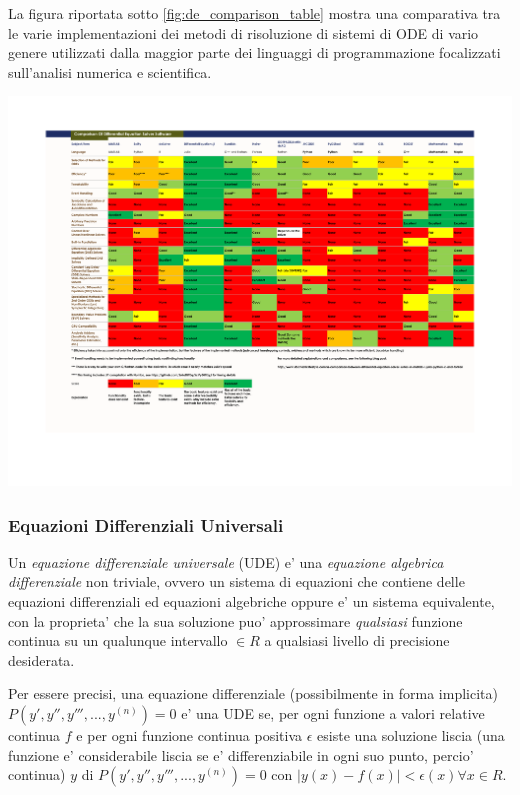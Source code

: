 La figura riportata sotto \ref{fig:de_comparison_table} \cite{10.15200/winn.153459.98975} mostra una comparativa tra le varie implementazioni dei 
metodi di risoluzione di sistemi di ODE di vario genere utilizzati dalla maggior
parte dei linguaggi di programmazione focalizzati sull'analisi numerica e scientifica.

\begin{minipage}{\linewidth}
    \centering
    \includegraphics[width=\textwidth]{img/de_solver_software_comparsion.pdf}
    \label{fig:de_comparison_table}
\end{minipage}

\subsubsection*{Equazioni Differenziali Universali}
Un \emph{equazione differenziale universale} (UDE) e' una \emph{equazione algebrica
differenziale}\cite{wiki:Differential-algebraic_system_of_equations} 
non triviale, ovvero un sistema di equazioni che contiene delle equazioni differenziali
ed equazioni algebriche oppure e' un sistema equivalente,
con la proprieta' che la sua soluzione puo' approssimare
\emph{qualsiasi} funzione continua su un qualunque intervallo $\in R$ a 
qualsiasi livello di precisione desiderata. \cite{wiki:Universal_differential_equation}

Per essere precisi, una equazione differenziale (possibilmente in forma implicita)
$P( y', y'', y''', ..., y^{(n)})=0$ e' una UDE se, per ogni funzione a valori relative
continua $f$ e per ogni funzione continua positiva $\epsilon$ esiste una 
soluzione liscia\cite{wiki:Smoothness} (una funzione e' considerabile liscia se e' 
differenziabile in ogni suo punto, percio' continua) $y$ di $P( y', y'', y''', ..., y^{(n)})=0$
con $|y(x) - f(x)| < \epsilon(x) \forall x \in R$.

